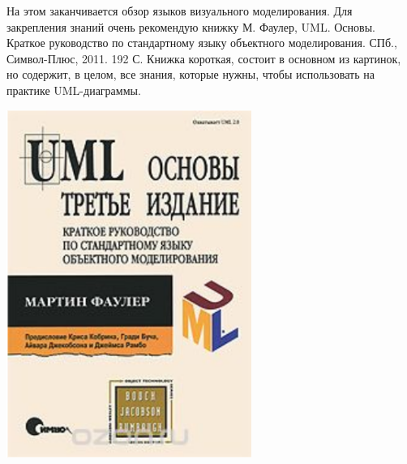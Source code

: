 \documentclass[a5paper]{article}
\newlength\Colsep
\begin{document}
\noindent\begin{minipage}{\textwidth}
    \begin{minipage}[c][6cm][c]{\dimexpr0.7\textwidth-0.5\Colsep\relax}
        На этом заканчивается обзор языков визуального моделирования. Для закрепления знаний очень рекомендую книжку М. Фаулер, UML. Основы. Краткое руководство по стандартному языку объектного моделирования. СПб., Символ-Плюс, 2011. 192 С. Книжка короткая, состоит в основном из картинок, но содержит, в целом, все знания, которые нужны, чтобы использовать на практике UML-диаграммы.
    \end{minipage}\hfill
    \begin{minipage}[c][6cm][c]{\dimexpr0.3\textwidth-0.5\Colsep\relax}
        \includegraphics[width=0.6\textwidth]{umlBookCover.png}
    \end{minipage}%
\end{minipage}
\end{document}
